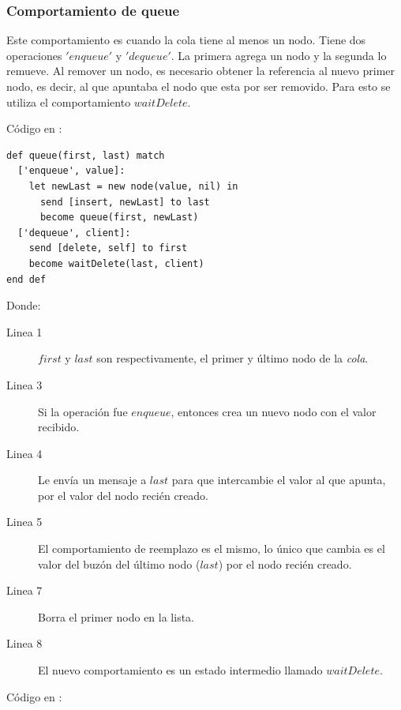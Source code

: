 \subsubsection*{Comportamiento de queue}
Este comportamiento es cuando la cola tiene al menos un nodo. Tiene dos operaciones $'enqueue'$ y $'dequeue'$. La primera agrega un nodo y la segunda lo remueve. Al remover un nodo, es necesario obtener la referencia al nuevo primer nodo, es decir, al que apuntaba el nodo que esta por ser removido. Para esto se utiliza el comportamiento $waitDelete$.

Código en \SAL:

\begin{lstlisting}[language=sal, style=simple]
def queue(first, last) match 
  ['enqueue', value]: 
    let newLast = new node(value, nil) in
      send [insert, newLast] to last
      become queue(first, newLast)
  ['dequeue', client]: 
    send [delete, self] to first
    become waitDelete(last, client)
end def
\end{lstlisting}

Donde:

\begin{description}
 \item [Linea 1] $first$ y $last$ son respectivamente, el primer y último nodo de la \textit{cola}.
 \item [Linea 3] Si la operación fue $enqueue$, entonces crea un nuevo nodo con el valor recibido. 
 \item [Linea 4] Le envía un mensaje a $last$ para que intercambie el valor al que apunta, por el valor del nodo recién creado.
 \item [Linea 5] El comportamiento de reemplazo es el mismo, lo único que cambia es el valor del buzón del último nodo ($last$) por el nodo recién creado.
 \item [Linea 7] Borra el primer nodo en la lista.
 \item [Linea 8] El nuevo comportamiento es un estado intermedio llamado $waitDelete$.
\end{description}

Código en \CSP:


